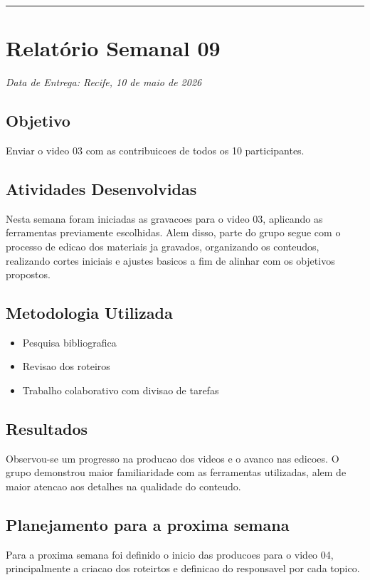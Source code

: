 \bigskip
\hrule
\bigskip

\section{Relatório Semanal 09}
{\centering\noindent\textit{Data de Entrega: Recife, 10 de maio de 2026}\par}\bigskip

\subsection{Objetivo}
Enviar o video 03 com as contribuicoes de todos os 10 participantes.

\subsection{Atividades Desenvolvidas}
Nesta semana foram iniciadas as gravacoes para o video 03, aplicando as ferramentas previamente escolhidas. Alem disso, parte do grupo segue com o processo de edicao dos materiais ja gravados, organizando os conteudos, realizando cortes iniciais e ajustes basicos a fim de alinhar com os objetivos propostos. 

\subsection{Metodologia Utilizada}
\begin{itemize}
    \item Pesquisa bibliografica
    \item Revisao dos roteiros
    \item Trabalho colaborativo com divisao de tarefas
\end{itemize}

\subsection{Resultados}
Observou-se um progresso na producao dos videos e o avanco nas edicoes. O grupo demonstrou maior familiaridade com as ferramentas utilizadas, alem de maior atencao aos detalhes na qualidade do conteudo.

\subsection{Planejamento para a proxima semana}
Para a proxima semana foi definido o inicio das producoes para o video 04, principalmente a criacao dos roteirtos e definicao do responsavel por cada topico.

